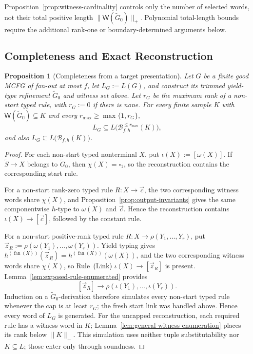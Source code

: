 \documentclass[11pt]{article}
\numberwithin{equation}{section}
\theoremstyle{plain}
\newtheorem{proposition}[theorem]{Proposition}
\theoremstyle{definition}
\theoremstyle{remark}
\newcommand{\Wit}{\mathsf{W}}
\newcommand{\tuple}[1]{\vec{#1}}
\newcommand{\blank}{\square}
\newcommand{\fan}{\operatorname{fan}}
\begin{document}
Proposition~\ref{prop:witness-cardinality} controls only the number of selected
words, not their total positive length $\|\Wit(\widetilde G_0)\|_+$.
Polynomial total-length bounds require the additional rank-one or
boundary-determined arguments below.


\subsection{Completeness and Exact Reconstruction}

\label{sec:completeness}

\begin{proposition}[Completeness from a target presentation]
\label{prop:completeness}
Let $G$ be a finite good MCFG of
fan-out at most $f$, let
$L_G:=L(G)$, and construct its trimmed yield-type refinement
$\widetilde G_0$ and witness set above.  Let $r_G$ be the maximum rank of a
non-start typed rule, with $r_G:=0$ if there is none.  For every
finite sample $K$ with $\Wit(\widetilde G_0)\subseteq K$ and every
$r_{\max}\ge\max\{1,r_G\}$,
\[
  L_G\subseteq L\bigl(\mathcal B_{f,h}^{\le r_{\max}}(K)\bigr),
\]
and also $L_G\subseteq L\bigl(\mathcal B_{f,h}(K)\bigr)$.
\end{proposition}

\begin{proof}
For each non-start typed nonterminal $X$, put $\iota(X):=[\omega(X)]$.  If
$\widetilde S\to X$ belongs to $\widetilde G_0$, then $\chi(X)=\blank_1$, so the reconstruction contains
the corresponding start rule.

For a non-start rank-zero typed rule $R:X\to\tuple c$, the two corresponding witness words share $\chi(X)$, and Proposition~\ref{prop:output-invariants} gives the same
componentwise $h$-type to $\omega(X)$ and $\tuple c$.  Hence the reconstruction contains
$\iota(X)\to[\tuple c]$, followed by the constant rule.

For a non-start positive-rank typed rule
$R:X\to\rho(Y_1,\ldots,Y_r)$, put
$\tuple z_R:=\rho(\omega(Y_1),\ldots,\omega(Y_r))$.  Yield typing gives
$h^{(\fan(X))}(\tuple z_R)=h^{(\fan(X))}(\omega(X))$, and the two corresponding witness words share $\chi(X)$, so Rule~(Link)
$\iota(X)\to[\tuple z_R]$ is present.  Lemma~\ref{lem:exposed-rule-enumerated}
provides
\[
 [\tuple z_R]\to\rho(\iota(Y_1),\ldots,\iota(Y_r)).
\]
Induction on a $\widetilde G_0$-derivation therefore simulates every non-start
typed rule whenever the cap is at least $r_G$; the fresh start link was handled
above.  Hence every word of $L_G$ is generated.
For the uncapped reconstruction, each required rule has a witness word in $K$;
Lemma~\ref{lem:general-witness-enumeration} places its rank below $\|K\|_+$.  This
simulation uses neither tuple substitutability nor $K\subseteq L$; those enter
only through soundness.
\end{proof}
\end{document}
